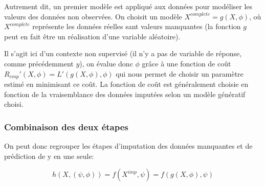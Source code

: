 \documentclass[12pt, a4paper]{article}
\begin{document}
Autrement dit, un premier modèle est appliqué aux données pour modéliser les valeurs des données non observées. On choisit un modèle $X^{complete} = g(X, \phi)$, où $X^{complete}$ représente les données réelles sant valeurs manquantes (la fonction $g$ peut en fait être un réalisation d'une variable aléatoire).%

Il s'agit ici d'un contexte non supervisé (il n'y a pas de variable de réponse, comme précédemment $y$), on évalue donc $\phi$ grâce à une fonction de coût $R_{emp}'(X, \phi) = L'(g(X, \phi), \phi)$ qui nous permet de choisir un paramètre estimé en minimisant ce coût. La fonction de coût est généralement choisie en fonction de la vraisemblance des données imputées selon un modèle génératif choisi. 


\subsubsection{Combinaison des deux étapes}
On peut donc regrouper les étapes d'imputation des données manquantes et de prédiction de y en une seule:

$$ h(X, (\psi, \phi)) = f(X^{imp}, \psi) = f( g(X, \phi), \psi) $$
\end{document}
